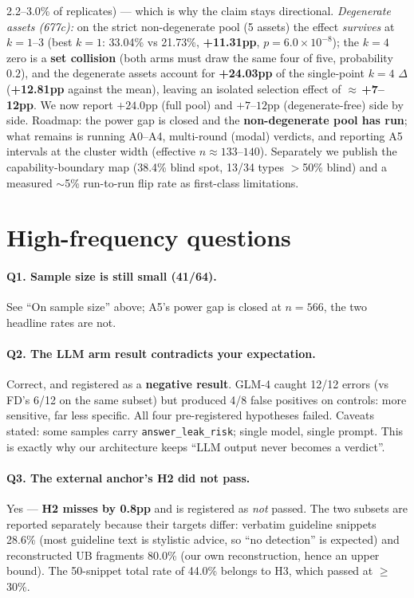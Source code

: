 \documentclass[11pt]{article}
\begin{document}
2.2--3.0\% of replicates) --- which is why the claim stays directional. \emph{Degenerate assets
(677c):} on the strict non-degenerate pool (5 assets) the effect \emph{survives} at $k{=}1$--3 (best
$k{=}1$: 33.04\% vs 21.73\%, \textbf{+11.31pp}, $p{=}6.0\times10^{-8}$); the $k{=}4$ zero is a
\textbf{set collision} (both arms must draw the same four of five, probability $0.2$), and the
degenerate assets account for \textbf{+24.03pp} of the single-point $k{=}4$ $\Delta$
(\textbf{+12.81pp} against the mean), leaving an isolated selection effect of
$\approx$\,\textbf{+7--12pp}. We now report $+24.0$pp (full pool) and $+7$--$12$pp (degenerate-free)
side by side.
Roadmap: the power gap is closed and the \textbf{non-degenerate pool has run}; what remains is
running A0--A4, multi-round (modal) verdicts, and reporting A5 intervals at the cluster width
(effective $n\approx133$--$140$). Separately we publish the capability-boundary map (38.4\% blind
spot, 13/34 types $>$50\% blind) and a measured $\sim$5\% run-to-run flip rate as first-class
limitations.

\section*{High-frequency questions}

\paragraph{Q1. Sample size is still small (41/64).}
See ``On sample size'' above; A5's power gap is closed at $n{=}566$, the two headline rates are not.

\paragraph{Q2. The LLM arm result contradicts your expectation.}
Correct, and registered as a \textbf{negative result}. GLM-4 caught 12/12 errors (vs FD's 6/12 on
the same subset) but produced 4/8 false positives on controls: more sensitive, far less specific.
All four pre-registered hypotheses failed. Caveats stated: some samples carry
\texttt{answer\_leak\_risk}; single model, single prompt. This is exactly why our architecture keeps
``LLM output never becomes a verdict''.

\paragraph{Q3. The external anchor's H2 did not pass.}
Yes --- \textbf{H2 misses by 0.8pp} and is registered as \emph{not} passed. The two subsets are
reported separately because their targets differ: verbatim guideline snippets 28.6\% (most guideline
text is stylistic advice, so ``no detection'' is expected) and reconstructed UB fragments 80.0\%
(our own reconstruction, hence an upper bound). The 50-snippet total rate of 44.0\% belongs to H3,
which passed at $\ge$30\%.
\end{document}
